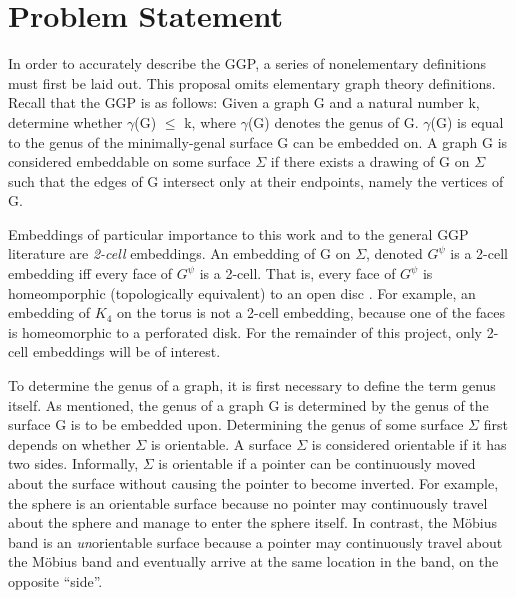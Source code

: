 \documentclass[12pt,conference]{IEEEtran}
\begin{document}
\section{Problem Statement}

In order to accurately describe the GGP, a series of nonelementary definitions must first be laid out. This proposal omits elementary graph theory definitions.
Recall that the GGP is as follows: Given a graph G and a natural number k, determine whether $\gamma$(G) $\leq$ k, where $\gamma$(G) denotes the genus of G. $\gamma$(G) is equal to the genus of the minimally-genal surface G can be embedded on. A graph G is considered embeddable on some surface $\Sigma$ if there exists a drawing of G on $\Sigma$ such that the edges of G intersect only at their endpoints, namely the vertices of G. 

Embeddings of particular importance to this work and to the general GGP literature are \textit{2-cell} embeddings. An embedding of G on $\Sigma$, denoted $G^{\psi}$ is a 2-cell embedding iff every face of $G^{\psi}$ is a 2-cell. That is, every face of $G^{\psi}$ is homeomporphic (topologically equivalent) to an open disc \cite{gao}. For example, an embedding of $K_{4}$ on the torus is not a 2-cell embedding, because one of the faces is homeomorphic to a perforated disk. For the remainder of this project, only 2-cell embeddings will be of interest. 

To determine the genus of a graph, it is first necessary to define the term genus itself. As mentioned, the genus of a graph G is determined by the genus of the surface G is to be embedded upon. Determining the genus of some surface $\Sigma$ first depends on whether $\Sigma$ is orientable. A surface $\Sigma$ is considered orientable if it has two sides. Informally, $\Sigma$ is orientable if a pointer can be continuously moved about the surface without causing the pointer to become inverted. For example, the sphere is an orientable surface because no pointer may continuously travel about the sphere and manage to enter the sphere itself. In contrast, the M\"obius band is an \textit{un}orientable surface because a pointer may continuously travel about the M\"obius band and eventually arrive at the same location in the band, on the opposite ``side''.
  
\end{document}
